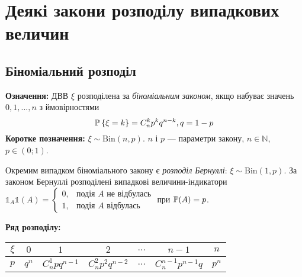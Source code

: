 \section{Деякі закони розподілу випадкових величин}

\subsection{Біноміальний розподіл}
\noindent\textbf{Означення:}
    ДВВ $\xi$ розподілена за \emph{біноміальним законом}, 
    якщо набуває значень $0,1,...,n$ з ймовірностями \begin{equation}
        \P\left\{\xi = k\right\} = C_n^k p^k q^{n-k}, q = 1 - p
    \end{equation}
\textbf{Коротке позначення:} $\xi \sim \mathrm{Bin}(n, p)$.
    $n$ і $p$ --- параметри закону, $n\in \mathbb{N}$, $p\in (0;1)$.

Окремим випадком біноміального закону є \emph{розподіл Бернуллі}: $\xi \sim \mathrm{Bin}(1, p)$.
За законом Бернуллі розподілені випадкові величини-індикатори $\mathds{1}_A \mathds{1}(A)= \begin{cases}
    0, & \text{подія }A\text{ не відбулась}\\ 1, & \text{подія }A\text{ відбулась}
\end{cases}$ при $\P(A) = p$.

\noindent\textbf{Ряд розподілу:}
\begin{center}
    \begin{tabular}{|c|c|c|c|c|c|c|}
        \hline
        $\xi$ & $0$ & $1$ & $2$ & $...$ & $n-1$ & $n$ \\
        \hline
        $p$ & $q^n$ & $C_n^1 pq^{n-1}$ & $C_n^2 p^2 q^{n-2}$ & $...$ & $C_n^{n-1}p^{n-1}q$ & $p^n$ \\
        \hline
    \end{tabular}
\end{center}


